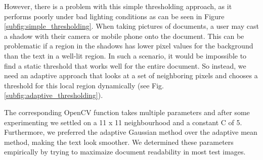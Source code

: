 \documentclass[bibliography=totoc]{scrartcl}
\begin{document}
However, there is a problem with this simple thresholding approach, as it performs poorly under bad lighting conditions as can be seen in Figure \ref{subfig:simple_thresholding}.
When taking pictures of documents, a user may cast a shadow with their camera or mobile phone onto the document.
This can be problematic if a region in the shadows has lower pixel values for the background than the text in a well-lit region.
In such a scenario, it would be impossible to find a static threshold that works well for the entire document.
So instead, we need an adaptive approach that looks at a set of neighboring pixels and chooses a threshold for this local region dynamically (see Fig. \ref{subfig:adaptive_thresholding}).

The corresponding OpenCV function takes multiple parameters and after some experimenting we settled on a 11 x 11 neighbourhood and a constant C of 5.
Furthermore, we preferred the adaptive Gaussian method over the adaptive mean method, making the text look smoother.
We determined these parameters empirically by trying to maximaize document readability in most test images.
\end{document}
